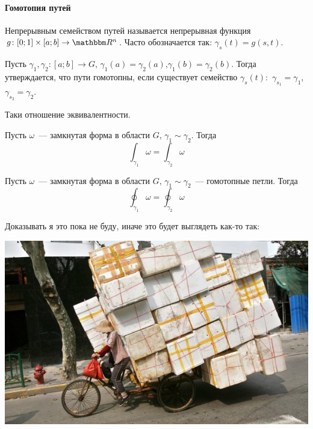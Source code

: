 \documentclass[12pt,timbord]{../../../notes}
\begin{document}
\paragraph{\underdev Гомотопия путей}
\label{par:lineint::homotopy}

\begin{defn}\label{defn:lineint::homotopy::set}
  Непрерывным семейством путей называется непрерывная функция $g\colon [0;1]\times[a;b]\to \R^n$.
  Часто обозначается так: $\gamma_s(t) = g(s,t)$. 
\end{defn}

\begin{defn}[$\ddot\sim$]\label{defn:lineint::homotopy::paths}
  Пусть $\gamma_1, \gamma_2\colon [a;b]\to G$, $\gamma_1(a)=
  \gamma_2(a)$,$\gamma_1(b)=\gamma_2(b)$. Тогда утверждается, что пути гомотопны, если существует
  семейство $\gamma_s(t)\colon$ $\gamma_{s_1} = \gamma_1$, $\gamma_{s_2} = \gamma_2$.
\end{defn}
\begin{rem*}
  Таки отношение эквивалентности.
\end{rem*}

\begin{thrm}\label{thrm:lineint::homotopy::lineinteq}
  Пусть $\omega$~--- замкнутая форма в области $G$, $\gamma_1 \sim \gamma_2$. Тогда
  \[
    \int _{\gamma_1} \omega = \int_{\gamma_2} \omega
  \]
\end{thrm} 
\begin{thrm}\label{thrm:lineint::homotopy::loopinteq}
  Пусть $\omega$~--- замкнутая форма в области $G$, $\gamma_1 \sim \gamma_2$~--- гомотопные петли.
  Тогда
  \[
    \oint _{\gamma_1} \omega = \oint_{\gamma_2} \omega
  \]
\end{thrm} 
\begin{rem*}
  Доказывать я это пока не буду, иначе это будет выглядеть как-то так:\par
  \includegraphics[width=0.7\linewidth]{overloaded}
\end{rem*}
\end{document}
